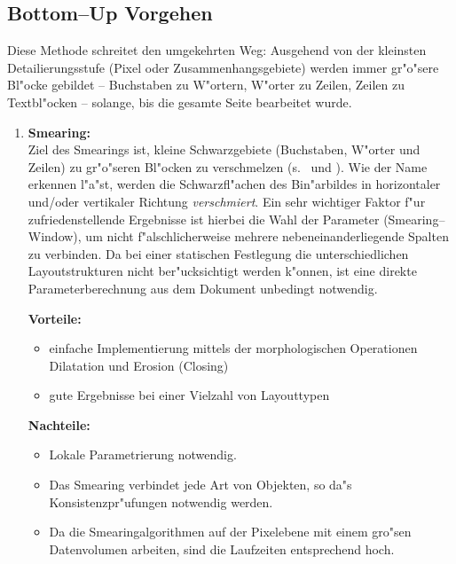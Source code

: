 
\subsection{Bottom--Up Vorgehen}\label{BottomUp}

Diese Methode schreitet den umgekehrten Weg: Ausgehend von der kleinsten Detailierungsstufe
(Pixel oder Zusammenhangsgebiete) werden immer gr"o"sere Bl"ocke gebildet --
Buchstaben zu W"ortern, W"orter zu Zeilen, Zeilen zu Textbl"ocken -- solange,
bis die gesamte Seite bearbeitet wurde.

\begin{enumerate}

  \item {\bf Smearing:}\\
        Ziel des Smearings ist, kleine Schwarzgebiete (Buchstaben, W"orter und Zeilen) zu
        gr"o"seren Bl"ocken zu verschmelzen (s.\ \cite{Wahl} und ). Wie der
        Name erkennen l"a"st, werden die Schwarzfl"achen des Bin"arbildes in horizontaler und/oder vertikaler
        Richtung {\it verschmiert}. Ein sehr wichtiger Faktor f"ur zufriedenstellende Ergebnisse
        ist hierbei die Wahl der Parameter (Smearing--Window), um nicht f"alschlicherweise mehrere
        nebeneinanderliegende Spalten zu verbinden. Da bei einer statischen Festlegung die
        unterschiedlichen Layoutstrukturen nicht ber"ucksichtigt werden k"onnen, ist eine direkte
        Parameterberechnung aus dem Dokument unbedingt notwendig.\label{Smearing}

        {\bf Vorteile:}
        \begin{itemize}
          \item einfache Implementierung mittels der morphologischen Operationen Dilatation und Erosion (Closing)
          \item gute Ergebnisse bei einer Vielzahl von Layouttypen
        \end{itemize}

        {\bf Nachteile:}
        \begin{itemize}
          \item Lokale Parametrierung notwendig.
          \item Das Smearing verbindet jede Art von Objekten, so da"s Konsistenzpr"ufungen notwendig
                werden.
          \item Da die Smearingalgorithmen auf der Pixelebene mit einem gro"sen Datenvolumen arbeiten,
                sind die Laufzeiten entsprechend hoch.
        \end{itemize}


\end{enumerate}
